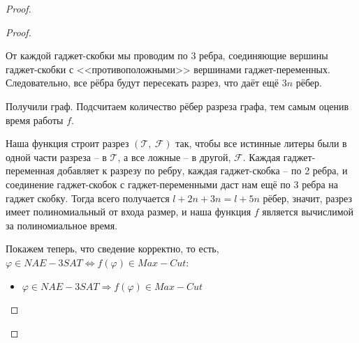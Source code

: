 \documentclass[a4paper,12pt]{article}
\begin{document}
\begin{proof}
\begin{proof}
\begin{center}
        \end{center}
        От каждой гаджет-скобки мы проводим по 3 ребра, соединяющие вершины гаджет-скобки с <<противоположными>> вершинами гаджет-переменных. Следовательно, все рёбра будут пересекать разрез, что даёт ещё $3n$ рёбер.
        
        Получили граф. Подсчитаем количество рёбер разреза графа, тем самым оценив время работы $f$. 
        
        Наша функция строит разрез $(\mathcal{T},\ \mathcal{F})$ так, чтобы все истинные литеры были в одной части разреза -- в $\mathcal{T}$, а все ложные -- в другой, $\mathcal{F}$. Каждая гаджет-переменная добавляет к разрезу по ребру, каждая гаджет-скобка -- по 2 ребра, и соединение гаджет-скобок с гаджет-переменными даст нам ещё по 3 ребра на гаджет скобку. Тогда всего получается $l + 2n + 3n = l + 5n$ рёбер, значит, разрез имеет полиномиальный от входа размер, и наша функция $f$ является вычислимой за полиномиальное время.
        
        Покажем теперь, что сведение корректно, то есть, $\varphi \in NAE-3SAT \Longleftrightarrow f(\varphi) \in Max-Cut$:
        \begin{itemize}
            \item $\varphi \in NAE-3SAT \Longrightarrow f(\varphi) \in Max-Cut$
            

\end{itemize}
\end{proof}
\end{proof}
\end{document}
